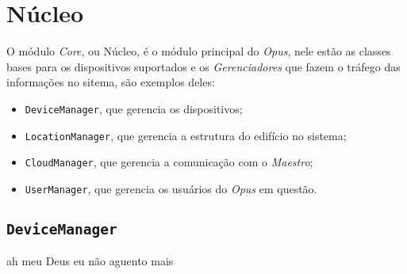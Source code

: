 \section{Núcleo}
\label{opus-sec:nucleo}

O módulo \emph{Core}, ou Núcleo, é o módulo principal do \emph{Opus}, nele estão
as classes bases para os dispositivos suportados e os \emph{Gerenciadores} que fazem o tráfego das informações
no sitema, são exemplos deles:
\begin{itemize}
    \item \lstinline{DeviceManager}, que gerencia os dispositivos;
    \item \lstinline{LocationManager}, que gerencia a estrutura do edifício no sistema;
    \item \lstinline{CloudManager}, que gerencia a comunicação com o \emph{Maestro};
    \item \lstinline{UserManager}, que gerencia os usuários do \emph{Opus} em questão.
\end{itemize}

\subsection{\lstinline{DeviceManager}}
ah meu Deus eu não aguento mais